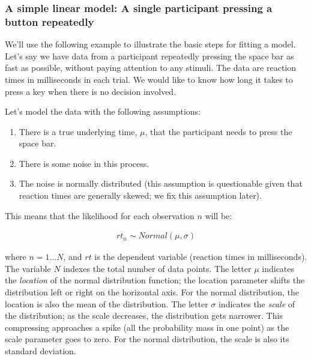 \documentclass[12pt,]{krantz}
\providecommand{\tightlist}{%
  \setlength{\itemsep}{0pt}\setlength{\parskip}{0pt}}
\theoremstyle{definition}
\theoremstyle{definition}
\theoremstyle{definition}
\theoremstyle{remark}
\begin{document}
\subsubsection{A simple linear model: A single participant pressing a
button repeatedly}\label{sec:simplenormal}

We'll use the following example to illustrate the basic steps for
fitting a model. Let's say we have data from a participant repeatedly
pressing the space bar as fast as possible, without paying attention to
any stimuli. The data are reaction times in milliseconds in each trial.
We would like to know how long it takes to press a key when there is no
decision involved.

Let's model the data with the following assumptions:

\begin{enumerate}
\def\labelenumi{\arabic{enumi}.}
\tightlist
\item
  There is a true underlying time, \(\mu\), that the participant needs
  to press the space bar.
\item
  There is some noise in this process.
\item
  The noise is normally distributed (this assumption is questionable
  given that reaction times are generally skewed; we fix this assumption
  later).
\end{enumerate}

This means that the likelihood for each observation \(n\) will be:

\begin{equation}
\begin{aligned}
rt_n \sim Normal(\mu, \sigma)
\end{aligned}
\label{eq:rtlik}
\end{equation}

where \(n =1 \ldots N\), and \(rt\) is the dependent variable (reaction
times in milliseconds). The variable \(N\) indexes the total number of
data points. The letter \(\mu\) indicates the \emph{location} of the
normal distribution function; the location parameter shifts the
distribution left or right on the horizontal axis. For the normal
distribution, the location is also the mean of the distribution. The
letter \(\sigma\) indicates the \emph{scale} of the distribution; as the
scale decreases, the distribution gets narrower. This compressing
approaches a spike (all the probability mass in one point) as the scale
parameter goes to zero. For the normal distribution, the scale is also
its standard deviation.
\end{document}
